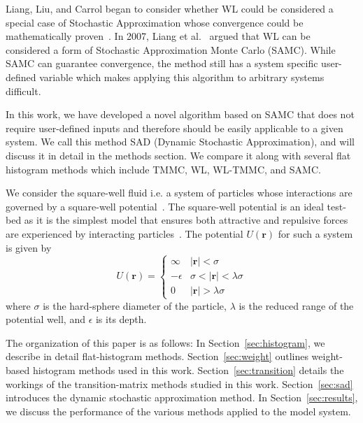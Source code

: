 \documentclass[letterpaper,twocolumn,amsmath,amssymb,pre,aps,10pt]{revtex4-1}
\begin{document}
Liang, Liu, and Carrol began to consider whether WL could be considered
a special case of Stochastic Approximation whose convergence could be
mathematically proven~\cite{liang2006theory, liang2007stochastic}. In
2007, Liang et al.~\cite{liang2007stochastic} argued that WL can be
considered a form of Stochastic Approximation Monte Carlo (SAMC). While
SAMC can guarantee convergence, the method still has a system specific
user-defined variable which makes applying this algorithm to arbitrary
systems difficult.

In this work, we have developed a novel algorithm based on SAMC that
does not require user-defined inputs and therefore should be easily
applicable to a given system.  We call this method SAD (Dynamic
Stochastic Approximation), and will discuss it in detail in the methods
section. We compare it along with several flat histogram methods
which include TMMC, WL, WL-TMMC, and SAMC.

We consider the square-well fluid i.e. a system of particles whose
interactions are governed by a square-well
potential~\cite{singh2003surface, barker2004perturbationSW}.  The
square-well potential is an ideal test-bed as it is the simplest model
that ensures both attractive and repulsive forces are experienced by
interacting particles~\cite{barker1967-SW-perturbation, vega1992phase}.
The potential $U(\textbf{r})$ for such a system is given by
\begin{equation}
 U(\textbf{r})=\begin{cases} \infty &
 \lvert\textbf{r}\rvert< \sigma\\-\epsilon &
 \sigma<\lvert\textbf{r}\rvert<\lambda\sigma\\0 &
 \lvert\textbf{r}\rvert > \lambda\sigma\end{cases}
\end{equation}
where $\sigma$ is the hard-sphere diameter of the particle, $\lambda$ is the
reduced range of the potential well, and $\epsilon$ is its depth.

The organization of this paper is as follows: In Section~\ref{sec:histogram}, we
describe in detail flat-histogram methods.  Section~\ref{sec:weight} outlines
weight-based histogram methods used in this work. Section~\ref{sec:transition}
details the workings of the transition-matrix methods studied in this work.
Section~\ref{sec:sad} introduces the dynamic stochastic approximation method.
In Section~\ref{sec:results}, we discuss the performance of the various methods
applied to the model system.
\end{document}
